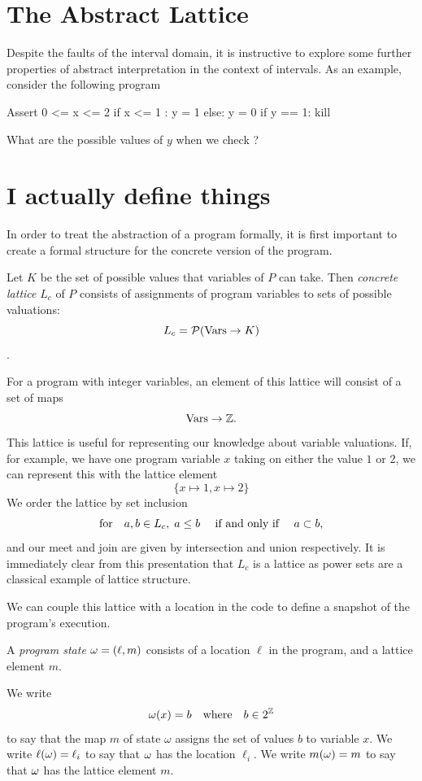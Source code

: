 \section{The Abstract Lattice}
Despite the faults of the interval domain, it is instructive to explore some further properties of abstract interpretation in the context of intervals.
As an example, consider the following program
\begin{code}
Assert 0 <= x <= 2
if x <= 1 : 
  y = 1  
else:
  y = 0 
if y == 1:
  kill
\end{code}
What are the possible values of $y$ when we check ?



\section{I actually define things}
In order to treat the abstraction of a program formally, it is first important to create a formal structure for the concrete version of the program.

\begin{definition}
 Let $K$ be the set of possible values that variables of $P$ can take. Then \emph{concrete lattice} $L_c$ of $P$ consists of assignments of program variables to sets of possible valuations:
 \[L_c = \mathcal{P}(\text{Vars} \to K)\]
 \cite{AbstractInterpretationCornellNotes}.
\end{definition}

For a program with integer variables, an element of this lattice will consist of a set of maps
\[
\text{Vars} \to \mathbb{Z}.
\]
This lattice is useful for representing our knowledge about variable valuations.
If, for example, we have one program variable $x$ taking on either the value $1$ or $2$, we can represent this with the lattice element
\[
  \{x \mapsto 1, x \mapsto 2\}
\]
We order the lattice by set inclusion
\[
  \text{for} \quad a, b \in L_c, \;a \leq b \quad \text{ if and only if } \quad a \subset b,
\]
and our meet and join are given by intersection and union respectively.
It is immediately clear from this presentation that $L_c$ is a lattice as power sets are a classical example of lattice structure.

We can couple this lattice with a location in the code to define a snapshot of the program's execution.
\begin{definition}
  A \emph{program state} $\omega = ( \ell, m)$ consists of a location $\ell$ in the program, and a lattice element $m$.
\end{definition}
We write 
\[
    \omega(x) = b \quad \text{where} \quad b \in 2^{\mathbb{Z}}
\]
to say that the map $m$ of state $\omega$ assigns the set of values $b$ to variable $x$.
We write $\ell(\omega) = \ell_i$ to say that $\omega$ has the location $\ell_i$.
We write $m(\omega) = m$ to say that $\omega$ has the lattice element $m$.

